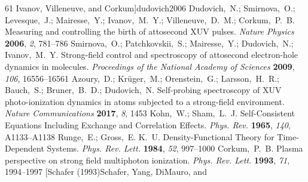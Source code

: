 \documentclass[journal=jacsat,manuscript=article]{achemso}
\begin{document}
\begin{mcitethebibliography}{61}
  Ivanov, Villeneuve, and Corkum]{dudovich2006}
Dudovich,~N.; Smirnova,~O.; Levesque,~J.; Mairesse,~Y.; Ivanov,~M.~Y.;
  Villeneuve,~D.~M.; Corkum,~P.~B. Measuring and controlling the birth of
  attosecond XUV pulses. \emph{Nature Physics} \textbf{2006}, \emph{2},
  781--786\relax
\mciteBstWouldAddEndPuncttrue
\mciteSetBstMidEndSepPunct{\mcitedefaultmidpunct}
{\mcitedefaultendpunct}{\mcitedefaultseppunct}\relax
\EndOfBibitem
{}
Smirnova,~O.; Patchkovskii,~S.; Mairesse,~Y.; Dudovich,~N.; Ivanov,~M.~Y.
  Strong-field control and spectroscopy of attosecond electron-hole dynamics in
  molecules. \emph{Proceedings of the National Academy of Sciences}
  \textbf{2009}, \emph{106}, 16556--16561\relax
\mciteBstWouldAddEndPuncttrue
\mciteSetBstMidEndSepPunct{\mcitedefaultmidpunct}
{\mcitedefaultendpunct}{\mcitedefaultseppunct}\relax
\EndOfBibitem
{}
Azoury,~D.; Kr{\"u}ger,~M.; Orenstein,~G.; Larsson,~H.~R.; Bauch,~S.;
  Bruner,~B.~D.; Dudovich,~N. Self-probing spectroscopy of XUV photo-ionization
  dynamics in atoms subjected to a strong-field environment. \emph{Nature
  Communications} \textbf{2017}, \emph{8}, 1453\relax
\mciteBstWouldAddEndPuncttrue
\mciteSetBstMidEndSepPunct{\mcitedefaultmidpunct}
{\mcitedefaultendpunct}{\mcitedefaultseppunct}\relax
\EndOfBibitem
{}
Kohn,~W.; Sham,~L.~J. Self-Consistent Equations Including Exchange and
  Correlation Effects. \emph{Phys. Rev.} \textbf{1965}, \emph{140},
  A1133--A1138\relax
\mciteBstWouldAddEndPuncttrue
\mciteSetBstMidEndSepPunct{\mcitedefaultmidpunct}
{\mcitedefaultendpunct}{\mcitedefaultseppunct}\relax
\EndOfBibitem
{}
Runge,~E.; Gross,~E. K.~U. Density-Functional Theory for Time-Dependent
  Systems. \emph{Phys. Rev. Lett.} \textbf{1984}, \emph{52}, 997--1000\relax
\mciteBstWouldAddEndPuncttrue
\mciteSetBstMidEndSepPunct{\mcitedefaultmidpunct}
{\mcitedefaultendpunct}{\mcitedefaultseppunct}\relax
\EndOfBibitem
{}
Corkum,~P.~B. Plasma perspective on strong field multiphoton ionization.
  \emph{Phys. Rev. Lett.} \textbf{1993}, \emph{71}, 1994--1997\relax
\mciteBstWouldAddEndPuncttrue
\mciteSetBstMidEndSepPunct{\mcitedefaultmidpunct}
{\mcitedefaultendpunct}{\mcitedefaultseppunct}\relax
\EndOfBibitem
\bibitem[Schafer (1993)Schafer, Yang, DiMauro, and

\end{mcitethebibliography}
\end{document}
